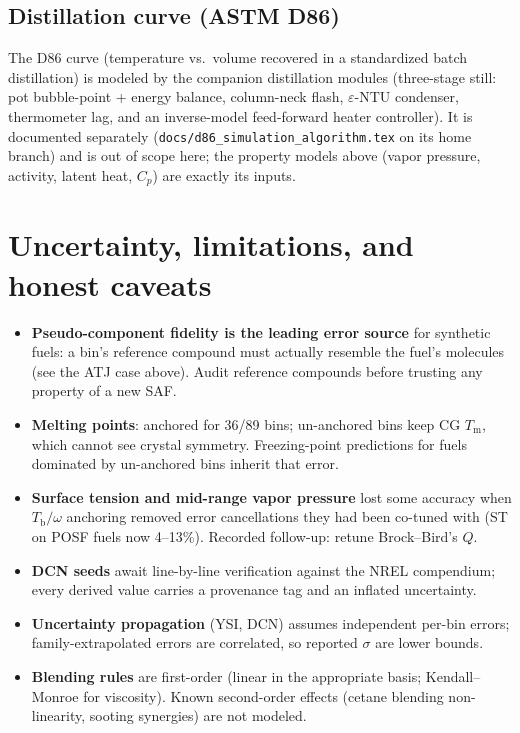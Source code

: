 \documentclass[11pt]{article}
\newcommand{\Tb}{T_{\mathrm{b}}}
\newcommand{\Tm}{T_{\mathrm{m}}}
\begin{document}
\subsection{Distillation curve (ASTM D86)}
The D86 curve (temperature vs.\ volume recovered in a standardized batch
distillation) is modeled by the companion distillation modules
(three-stage still: pot bubble-point + energy balance, column-neck flash,
$\varepsilon$-NTU condenser, thermometer lag, and an inverse-model
feed-forward heater controller). It is documented separately
(\texttt{docs/d86\_simulation\_algorithm.tex} on its home branch) and is out
of scope here; the property models above (vapor pressure, activity, latent
heat, $C_p$) are exactly its inputs.

\section{Uncertainty, limitations, and honest caveats}

\begin{itemize}
\item \textbf{Pseudo-component fidelity is the leading error source} for
  synthetic fuels: a bin's reference compound must actually resemble the
  fuel's molecules (see the ATJ case above). Audit reference compounds
  before trusting any property of a new SAF.
\item \textbf{Melting points}: anchored for 36/89 bins; un-anchored bins
  keep CG $\Tm$, which cannot see crystal symmetry. Freezing-point
  predictions for fuels dominated by un-anchored bins inherit that error.
\item \textbf{Surface tension and mid-range vapor pressure} lost some
  accuracy when $\Tb/\omega$ anchoring removed error cancellations they had
  been co-tuned with (ST on POSF fuels now 4--13\%). Recorded follow-up:
  retune Brock--Bird's $Q$.
\item \textbf{DCN seeds} await line-by-line verification against the NREL
  compendium; every derived value carries a provenance tag and an inflated
  uncertainty.
\item \textbf{Uncertainty propagation} (YSI, DCN) assumes independent
  per-bin errors; family-extrapolated errors are correlated, so reported
  $\sigma$ are lower bounds.
\item \textbf{Blending rules} are first-order (linear in the appropriate
  basis; Kendall--Monroe for viscosity). Known second-order effects
  (cetane blending non-linearity, sooting synergies) are not modeled.
\end{itemize}
\end{document}
